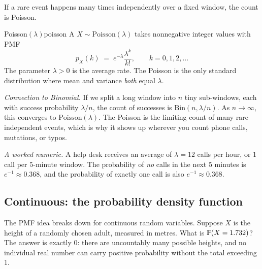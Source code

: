If a rare event happens many times independently over a fixed window, the count is Poisson.

\begin{example}{Poisson$(\lambda)$}{poisson}
A  $X \sim \mathrm{Poisson}(\lambda)$ takes nonnegative integer values with PMF
\[
p_X(k) \;=\; e^{-\lambda} \frac{\lambda^k}{k!}, \qquad k = 0, 1, 2, \ldots
\]
The parameter $\lambda > 0$ is the average rate. The Poisson is the only standard distribution where mean and variance \emph{both} equal $\lambda$.

\textit{Connection to Binomial.} If we split a long window into $n$ tiny sub-windows, each with success probability $\lambda / n$, the count of successes is $\mathrm{Bin}(n, \lambda / n)$. As $n \to \infty$, this converges to $\mathrm{Poisson}(\lambda)$. The Poisson is the limiting count of many rare independent events, which is why it shows up wherever you count phone calls, mutations, or typos.

\textit{A worked numeric.} A help desk receives an average of $\lambda = 12$ calls per hour, or $1$ call per $5$-minute window. The probability of \emph{no} calls in the next $5$ minutes is $e^{-1} \approx 0.368$, and the probability of exactly one call is also $e^{-1} \approx 0.368$.
\end{example}


\subsection*{Continuous: the probability density function}

The PMF idea breaks down for continuous random variables. Suppose $X$ is the height of a randomly chosen adult, measured in metres. What is $\mathbb{P}(X = 1.732)$? The answer is exactly $0$: there are uncountably many possible heights, and no individual real number can carry positive probability without the total exceeding $1$.


